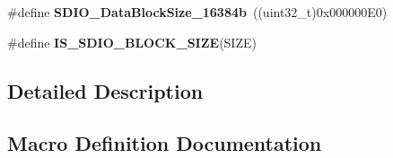 \begin{DoxyCompactItemize}
\item 
\hypertarget{group___s_d_i_o___data___block___size_gae80bc49dbed677f7087d523c31fe10ae}{}\#define {\bfseries S\+D\+I\+O\+\_\+\+Data\+Block\+Size\+\_\+16384b}~((uint32\+\_\+t)0x000000\+E0)\label{group___s_d_i_o___data___block___size_gae80bc49dbed677f7087d523c31fe10ae}

\item 
\#define {\bfseries I\+S\+\_\+\+S\+D\+I\+O\+\_\+\+B\+L\+O\+C\+K\+\_\+\+S\+I\+Z\+E}(S\+I\+Z\+E)
\end{DoxyCompactItemize}


\subsection{Detailed Description}


\subsection{Macro Definition Documentation}
\hypertarget{group___s_d_i_o___data___block___size_ga25ce8d64134659c479d61aa681761948}{}
